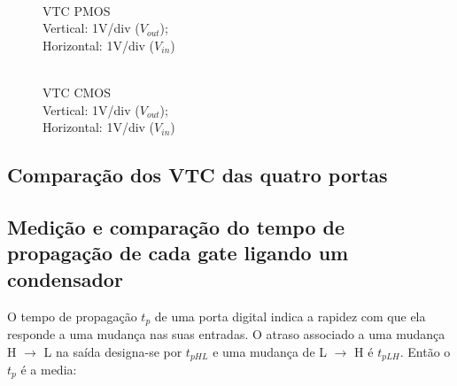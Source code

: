 \documentclass[pdftex,12pt,a4paper]{report}
\begin{document}
\begin{figure}[!htb]
  \centerline{}
  \caption{\\VTC PMOS \\Vertical: 1V/div ($V_{out}$); \\Horizontal: 1V/div ($V_{in}$)}
\endminipage\hfill
{}
  \centerline{}
  \caption{\\VTC CMOS \\Vertical: 1V/div ($V_{out}$); \\Horizontal: 1V/div ($V_{in}$)}
\endminipage\hfill
\end{figure}

\subsection{Comparação dos VTC das quatro portas}

\newpage
\subsection{Medição e comparação do tempo de propagação de cada gate ligando um condensador}

O tempo de propagação $t_p$ de uma porta digital indica a rapidez com que ela responde a uma mudança nas suas entradas. O atraso associado a uma mudança H $\rightarrow$ L na saída designa-se por $t_{pHL}$ e uma mudança de L $\rightarrow$ H é $t_{pLH}$. Então o $t_p$ é a media:
\end{document}
